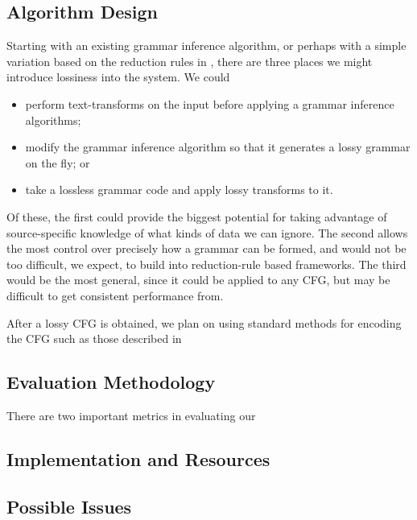 \documentclass[11pt]{article}
\begin{document}
\subsection{Algorithm Design}

Starting with an existing grammar inference algorithm, or perhaps with a simple
variation based on the reduction rules in \cite{grammarcodes}, there are three
places we might introduce lossiness into the system.  We could
\begin{itemize}
  \item perform text-transforms on the input before applying a grammar
    inference algorithms;
  \item modify the grammar inference algorithm so that it generates a lossy
    grammar on the fly; or
  \item take a lossless grammar code and apply lossy transforms to it.
\end{itemize}
Of these, the first could provide the biggest potential for taking advantage of
source-specific knowledge of what kinds of data we can ignore.  The second
allows the most control over precisely how a grammar can be formed, and would
not be too difficult, we expect, to build into reduction-rule based frameworks.
The third would be the most general, since it could be applied to any CFG, but
may be difficult to get consistent performance from.

After a lossy CFG is obtained, we plan on using standard methods for encoding
the CFG such as those described in \cite{sequitur2}

\subsection{Evaluation Methodology}

There are two important metrics in evaluating our

\subsection{Implementation and Resources}

\subsection{Possible Issues}

\nocite{*}


\end{document}
